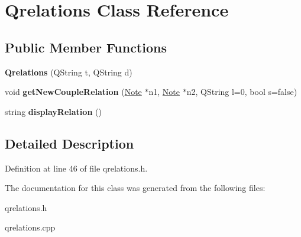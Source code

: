 \hypertarget{class_qrelations}{}\section{Qrelations Class Reference}
\label{class_qrelations}
\subsection*{Public Member Functions}
\begin{DoxyCompactItemize}
\item 
\mbox{\label{class_qrelations_a72cdb149d1aca6aadd2c69af35fd6327}} 
{\bfseries Qrelations} (Q\+String t, Q\+String d)
\item 
\mbox{\label{class_qrelations_a5811cf8d362be772d2891fce3b821e97}} 
void {\bfseries get\+New\+Couple\+Relation} (\hyperlink{class_note}{Note} $\ast$n1, \hyperlink{class_note}{Note} $\ast$n2, Q\+String l=0, bool s=false)
\item 
\mbox{\label{class_qrelations_ab8ae416ea63621095fa90508f795b80e}} 
string {\bfseries display\+Relation} ()
\end{DoxyCompactItemize}


\subsection{Detailed Description}


Definition at line 46 of file qrelations.\+h.



The documentation for this class was generated from the following files\+:\begin{DoxyCompactItemize}
\item 
qrelations.\+h\item 
qrelations.\+cpp\end{DoxyCompactItemize}
